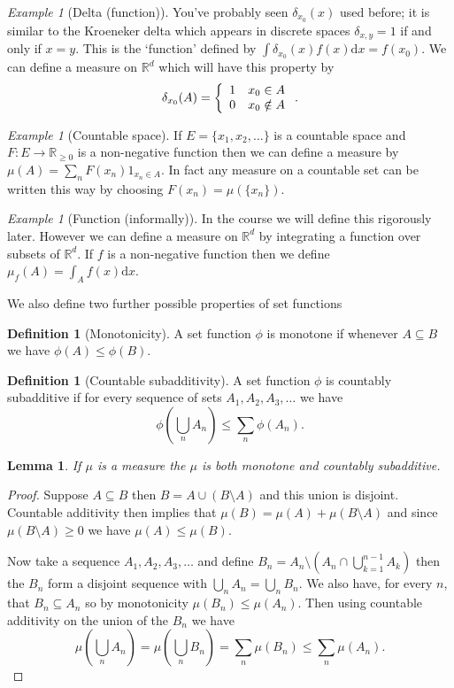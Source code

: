 \documentclass[11pt]{article}
\newtheorem{lem}[thm]{Lemma}
\theoremstyle{definition}
\newtheorem{dfn}[thm]{Definition}
\theoremstyle{remark}
\newtheorem{ex}[thm]{Example}
\begin{document}
\begin{ex}[Delta (function)]
You've probably seen $\delta_{x_0}(x)$ used before; it is similar to the Kroeneker delta which appears in discrete spaces $\delta_{x,y} = 1$ if and only if $x=y$. This is the `function' defined by $\int \delta_{x_0}(x)f(x) \mathrm{d}x = f(x_0)$.  We can define a measure on $\mathbb{R}^d$ which will have this property by \[\delta_{x_0}(A) = \left\{ \begin{array}{l l} 1 & x_0 \in A \\ 0 & x_0 \notin A \end{array} \right. .\]
\end{ex}

\begin{ex}[Countable space]
If $E = \{ x_1, x_2, \dots\}$ is a countable space and $F: E \rightarrow \mathbb{R}_{\geq 0}$ is a non-negative function then we can define a measure by $\mu(A) = \sum_n F(x_n)1_{x_n \in A}$. In fact any measure on a countable set can be written this way by choosing $F(x_n) = \mu(\{x_n\})$.
\end{ex}

\begin{ex}[Function (informally)]
In the course we will define this rigorously later. However we can define a measure on $\mathbb{R}^d$ by integrating a function over subsets of $\mathbb{R}^d$. If $f$ is a non-negative function then we define $\mu_f(A) = \int_A f(x) \mathrm{d}x$.
\end{ex}

We also define two further possible properties of set functions
\begin{dfn}[Monotonicity]
A set function $\phi$ is monotone if whenever $A \subseteq B$ we have $\phi(A) \leq \phi(B)$.
\end{dfn}

\begin{dfn}[Countable subadditivity]
A set function $\phi$ is countably subadditive if for every sequence of sets $A_1, A_2, A_3, \dots$ we have 
\[ \phi \left( \bigcup_n A_n \right) \leq \sum_n \phi(A_n). \]
\end{dfn}

\begin{lem}
If $\mu$ is a measure the $\mu$ is both monotone and countably subadditive.
\end{lem}
\begin{proof}
Suppose $A \subseteq B$ then $B = A \cup (B \setminus A)$ and this union is disjoint. Countable additivity then implies that $\mu(B) = \mu(A) + \mu(B \setminus A)$ and since $\mu(B \setminus A) \geq 0$ we have $\mu(A) \leq \mu(B)$.

Now take a sequence $A_1, A_2, A_3, \dots$ and define $B_n = A_n \setminus \left(A_n \cap \bigcup_{k=1}^{n-1}A_k \right)$ then the $B_n$ form a disjoint sequence with $\bigcup_n A_n = \bigcup_n B_n$. We also have, for every $n$, that $B_n \subseteq A_n$ so by monotonicity $\mu(B_n) \leq \mu(A_n)$. Then using countable additivity on the union of the $B_n$ we have
\[ \mu(\bigcup_n A_n) = \mu(\bigcup_n B_n) = \sum_n \mu(B_n) \leq \sum_n \mu(A_n). \]
\end{proof}
\end{document}
